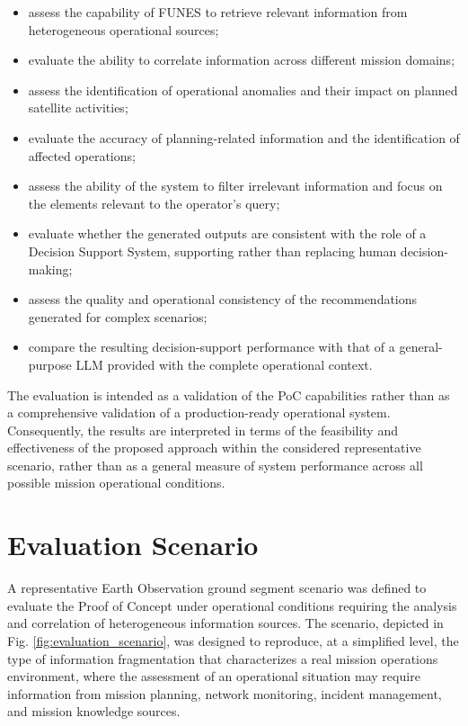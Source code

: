 \begin{itemize}
\item assess the capability of FUNES to retrieve relevant information from heterogeneous operational sources;
\item evaluate the ability to correlate information across different mission domains;
\item assess the identification of operational anomalies and their impact on planned satellite activities;
\item evaluate the accuracy of planning-related information and the identification of affected operations;
\item assess the ability of the system to filter irrelevant information and focus on the elements relevant to the operator's query;
\item evaluate whether the generated outputs are consistent with the role of a Decision Support System, supporting rather than replacing human decision-making;
\item assess the quality and operational consistency of the recommendations generated for complex scenarios;
\item compare the resulting decision-support performance with that of a general-purpose LLM provided with the complete operational context.
\end{itemize}

The evaluation is intended as a validation of the PoC capabilities rather than as a comprehensive validation of a production-ready operational system. Consequently, the results are interpreted in terms of the feasibility and effectiveness of the proposed approach within the considered representative scenario, rather than as a general measure of system performance across all possible mission operational conditions.


\section{Evaluation Scenario}
\label{sec:evaluation scenario}

A representative Earth Observation ground segment scenario was defined to evaluate the Proof of Concept under operational conditions requiring the analysis and correlation of heterogeneous information sources. The scenario, depicted in Fig. \ref{fig:evaluation_scenario}, was designed to reproduce, at a simplified level, the type of information fragmentation that characterizes a real mission operations environment, where the assessment of an operational situation may require information from mission planning, network monitoring, incident management, and mission knowledge sources.

